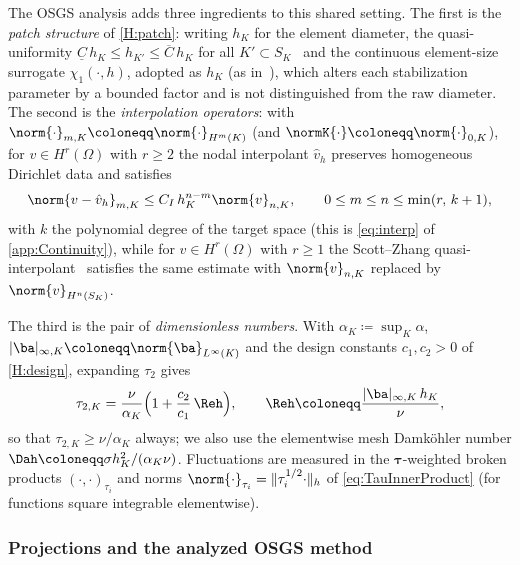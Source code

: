 The OSGS analysis adds three ingredients to this shared setting. The first is the \emph{patch
structure} of \cref{H:patch}: writing $h_K$ for the element diameter, the quasi{\hyp}uniformity
$\underline{C}\, h_{K} \le h_{K'} \le \overline{C}\, h_K$ for all $K' \subset S_K$~\cite{AinsworthOden}
and the continuous element{\hyp}size surrogate $\chi_1(\cdot, h)$, adopted as $h_K$ (as
in~\cite[Lemma~1]{codina2008analysis}), which alters each stabilization parameter by a bounded factor
and is not distinguished from the raw diameter. The second is the \emph{interpolation operators}: with
$\norm{\cdot}_{m,K} \coloneqq \norm{\cdot}_{H^m(K)}$ (and $\normK{\cdot} \coloneqq \norm{\cdot}_{0,K}$), for
$v \in H^{r}(\Omega)$ with $r \ge 2$ the nodal interpolant $\hat v_h$ preserves homogeneous Dirichlet
data and satisfies
\begin{equation}
  \label{oa:eq:NodalInterp}
  \norm{v - \hat v_h}_{m,K} \le C_I\, h_K^{n-m}\norm{v}_{n,K},
  \qquad 0 \le m \le n \le \min(r,\, k+1),
\end{equation}
with $k$ the polynomial degree of the target space (this is \cref{eq:interp} of \cref{app:Continuity}),
while for $v \in H^{r}(\Omega)$ with $r \ge 1$ the Scott--Zhang quasi{\hyp}interpolant~\cite{ScottZhang}
satisfies the same estimate with $\norm{v}_{n,K}$ replaced by $\norm{v}_{H^n(S_K)}$.

The third is the pair of \emph{dimensionless numbers}. With $\alpha_K \coloneqq \sup_K \alpha$,
$|\ba|_{\infty,K} \coloneqq \norm{\ba}_{L^\infty(K)}$ and the design constants $c_1,c_2>0$ of \cref{H:design},
expanding $\tau_2$ gives
\begin{equation}
  \label{oa:eq:Tau2Expanded}
  \tau_{2,K}
  = \frac{\nu}{\alpha_K}\Bigl( 1 + \frac{c_2}{c_1}\,\Reh \Bigr),
  \qquad
  \Reh \coloneqq \frac{|\ba|_{\infty,K}\, h_K}{\nu},
\end{equation}
so that $\tau_{2,K} \ge \nu/\alpha_K$ always; we also use the elementwise mesh Damk\"ohler number
$\Dah \coloneqq \sigma h_K^2/(\alpha_K\nu)$. Fluctuations are measured in the $\boldsymbol{\tau}${\hyp}weighted
broken products $(\cdot,\cdot)_{\tau_i}$ and norms $\norm{\cdot}_{\tau_i} = \lVert \tau_i^{1/2}\cdot\rVert_h$
of \cref{eq:TauInnerProduct} (for functions square integrable elementwise).

\subsubsection{Projections and the analyzed OSGS method}
\label{oa:sec:method}

